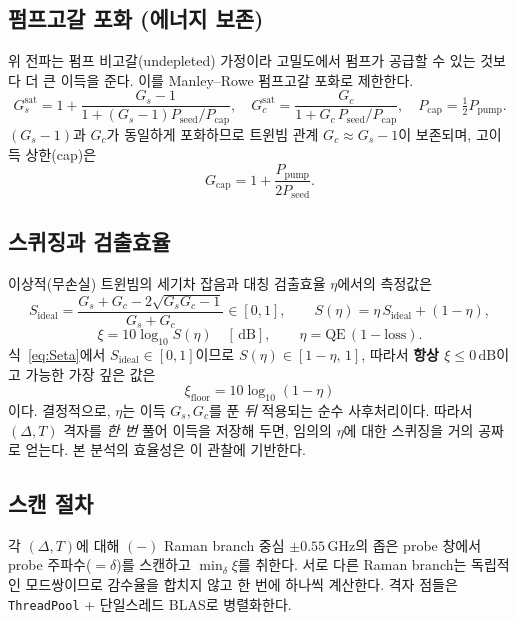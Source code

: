 \documentclass[11pt,a4paper]{article}
\newcommand{\dB}{\,\mathrm{dB}}
\newcommand{\GHz}{\,\mathrm{GHz}}
\begin{document}
\subsection{펌프고갈 포화 (에너지 보존)}
위 전파는 펌프 비고갈(undepleted) 가정이라 고밀도에서 펌프가 공급할 수 있는 것보다 더 큰
이득을 준다. 이를 Manley--Rowe 펌프고갈 포화로 제한한다.
\begin{equation}
G_s^{\mathrm{sat}}=1+\frac{G_s-1}{1+(G_s-1)P_{\mathrm{seed}}/P_{\mathrm{cap}}},\quad
G_c^{\mathrm{sat}}=\frac{G_c}{1+G_c\,P_{\mathrm{seed}}/P_{\mathrm{cap}}},\quad
P_{\mathrm{cap}}=\tfrac12 P_{\mathrm{pump}} .
\label{eq:cap}
\end{equation}
$(G_s-1)$과 $G_c$가 동일하게 포화하므로 트윈빔 관계 $G_c\approx G_s-1$이 보존되며, 고이득
상한(cap)은
\begin{equation}
G_{\mathrm{cap}}=1+\frac{P_{\mathrm{pump}}}{2P_{\mathrm{seed}}} .
\label{eq:Gcap}
\end{equation}

\subsection{스퀴징과 검출효율}
이상적(무손실) 트윈빔의 세기차 잡음과 대칭 검출효율 $\eta$에서의 측정값은
\begin{equation}
S_{\mathrm{ideal}}=\frac{G_s+G_c-2\sqrt{G_sG_c-1}}{G_s+G_c}\in[0,1],\qquad
S(\eta)=\eta\,S_{\mathrm{ideal}}+(1-\eta),
\label{eq:Seta}
\end{equation}
\begin{equation}
\xi=10\log_{10}S(\eta)\quad[\dB],\qquad \eta=\mathrm{QE}\,(1-\mathrm{loss}).
\end{equation}
식~\eqref{eq:Seta}에서 $S_{\mathrm{ideal}}\in[0,1]$이므로 $S(\eta)\in[1-\eta,\,1]$,
따라서 \textbf{항상 $\xi\le 0\dB$}이고 가능한 가장 깊은 값은
\begin{equation}
\boxed{\;\xi_{\mathrm{floor}}=10\log_{10}(1-\eta)\;}
\label{eq:floor}
\end{equation}
이다. 결정적으로, $\eta$는 이득 $G_s,G_c$를 푼 \emph{뒤} 적용되는 순수 사후처리이다. 따라서
$(\Delta,T)$ 격자를 \emph{한 번} 풀어 이득을 저장해 두면, 임의의 $\eta$에 대한 스퀴징을
거의 공짜로 얻는다. 본 분석의 효율성은 이 관찰에 기반한다.

\subsection{스캔 절차}
각 $(\Delta,T)$에 대해 $(-)$ Raman branch 중심 $\pm 0.55\GHz$의 좁은 probe 창에서 probe
주파수($=\delta$)를 스캔하고 $\min_\delta \xi$를 취한다. 서로 다른 Raman branch는 독립적인
모드쌍이므로 감수율을 합치지 않고 한 번에 하나씩 계산한다. 격자 점들은 \texttt{ThreadPool}
+ 단일스레드 BLAS로 병렬화한다.
\end{document}
